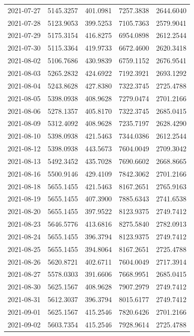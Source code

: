 \begin{footnotesize}
\begin{longtable}{lllll}
2021-07-27 & 5145.3257 & 401.0981 & 7257.3838 & 2644.6040 \\
2021-07-28 & 5123.9053 & 399.5253 & 7105.7363 & 2579.9041 \\
2021-07-29 & 5175.3154 & 416.8275 & 6954.0898 & 2612.2544 \\
2021-07-30 & 5115.3364 & 419.9733 & 6672.4600 & 2620.3418 \\
2021-08-02 & 5106.7686 & 430.9839 & 6759.1152 & 2676.9541 \\
2021-08-03 & 5265.2832 & 424.6922 & 7192.3921 & 2693.1292 \\
2021-08-04 & 5243.8628 & 427.8380 & 7322.3745 & 2725.4788 \\
2021-08-05 & 5398.0938 & 408.9628 & 7279.0474 & 2701.2166 \\
2021-08-06 & 5278.1357 & 405.8170 & 7322.3745 & 2685.0415 \\
2021-08-09 & 5312.4092 & 408.9628 & 7235.7197 & 2628.4290 \\
2021-08-10 & 5398.0938 & 421.5463 & 7344.0386 & 2612.2544 \\
2021-08-12 & 5398.0938 & 443.5673 & 7604.0049 & 2709.3042 \\
2021-08-13 & 5492.3452 & 435.7028 & 7690.6602 & 2668.8665 \\
2021-08-16 & 5500.9146 & 429.4109 & 7842.3062 & 2701.2166 \\
2021-08-18 & 5655.1455 & 421.5463 & 8167.2651 & 2765.9163 \\
2021-08-19 & 5655.1455 & 407.3900 & 7885.6343 & 2741.6538 \\
2021-08-20 & 5655.1455 & 397.9522 & 8123.9375 & 2749.7412 \\
2021-08-23 & 5646.5776 & 413.6816 & 8275.5840 & 2782.0913 \\
2021-08-24 & 5655.1455 & 396.3794 & 8123.9375 & 2749.7412 \\
2021-08-25 & 5655.1455 & 394.8064 & 8167.2651 & 2725.4788 \\
2021-08-26 & 5620.8721 & 402.6711 & 7604.0049 & 2717.3914 \\
2021-08-27 & 5578.0303 & 391.6606 & 7668.9951 & 2685.0415 \\
2021-08-30 & 5625.1567 & 408.9628 & 7907.2979 & 2749.7412 \\
2021-08-31 & 5612.3037 & 396.3794 & 8015.6177 & 2749.7412 \\
2021-09-01 & 5625.1567 & 415.2546 & 7820.6426 & 2701.2166 \\
2021-09-02 & 5603.7354 & 415.2546 & 7928.9614 & 2725.4788 \\

\end{longtable}
\end{footnotesize}
